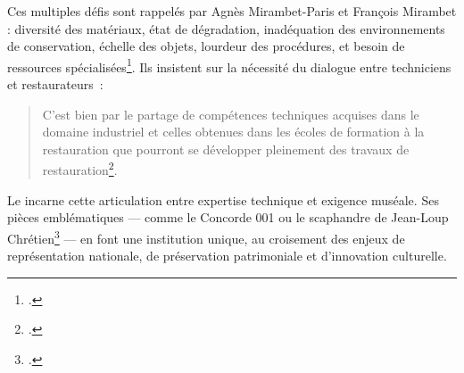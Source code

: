 Ces multiples défis sont rappelés par Agnès Mirambet-Paris et François Mirambet : diversité des matériaux, état de dégradation, inadéquation des environnements de conservation, échelle des objets, lourdeur des procédures, et besoin de ressources spécialisées\footcite{mirambet-parisConservationrestaurationPatrimoineTechnique2011}. Ils insistent sur la nécessité du dialogue entre techniciens et restaurateurs :
\begin{quote}
	\og C’est bien par le partage de compétences techniques acquises dans le domaine industriel et celles obtenues dans les écoles de formation à la restauration que pourront se développer pleinement des travaux de restauration\footcite{mirambet-parisConservationrestaurationPatrimoineTechnique2011}.\fg
\end{quote}

Le \mae incarne cette articulation entre expertise technique et exigence muséale. Ses pièces emblématiques — comme le Concorde 001 ou le scaphandre de Jean-Loup Chrétien\footcite{champenoisTresorsMuseeLair} — en font une institution unique, au croisement des enjeux de représentation nationale, de préservation patrimoniale et d’innovation culturelle.
